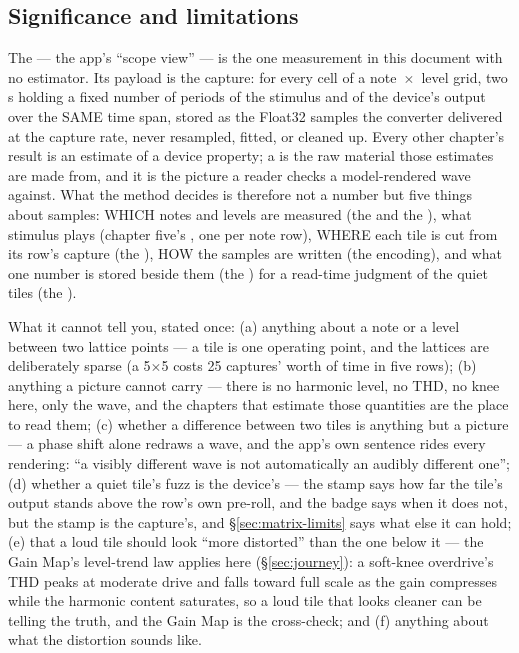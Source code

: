\documentclass[11pt,a4paper]{article}
\begin{document}
\subsection{Significance and limitations}
The  --- the app's ``scope view'' --- is the one
measurement in this document with no estimator. Its payload is the
capture: for every cell of a note~$\times$~level grid, two s
holding a fixed number of periods of the stimulus and of the device's
output over the SAME time span, stored as the Float32 samples the
converter delivered at the capture rate, never resampled, fitted, or
cleaned up. Every other chapter's result is an estimate of a device
property; a  is the raw material those estimates are made
from, and it is the picture a reader checks a model-rendered wave
against. What the method decides is therefore not a number but five
things about samples: WHICH notes and levels are measured (the
 and the ), what stimulus
plays (chapter five's , one per note row), WHERE each
tile is cut from its row's capture (the ), HOW
the samples are written (the encoding), and what one number is stored
beside them (the ) for a read-time judgment of the
quiet tiles (the ).

What it cannot tell you, stated once: (a) anything about a note or a
level between two lattice points --- a tile is one operating point, and
the lattices are deliberately sparse (a 5$\times$5 costs 25 captures'
worth of time in five rows); (b) anything a picture cannot carry ---
there is no harmonic level, no THD, no knee here, only the wave, and the
chapters that estimate those quantities are the place to read them;
(c) whether a difference between two tiles is anything but a picture ---
a phase shift alone redraws a wave, and the app's own sentence rides
every rendering:
``a visibly different wave is not automatically an audibly different one'';
(d) whether a quiet tile's fuzz is the device's
--- the stamp says how far the tile's output stands above the row's own
pre-roll, and the badge says when it does not, but the stamp is the
capture's, and \S\ref{sec:matrix-limits} says what else it can hold;
(e) that a loud tile should look ``more distorted'' than the one below
it --- the Gain Map's level-trend law applies here (\S\ref{sec:journey}):
a soft-knee overdrive's THD peaks at moderate drive and falls toward full
scale as the gain compresses while the harmonic content saturates, so a
loud tile that looks cleaner can be telling the truth, and the Gain Map
is the cross-check; and (f) anything about what the distortion sounds like.
\end{document}
